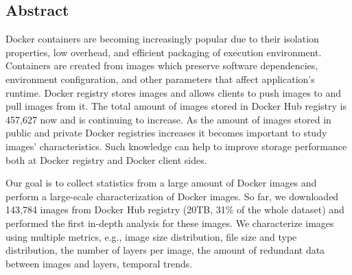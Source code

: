 \subsection*{Abstract}

Docker containers are becoming increasingly popular due to their isolation
properties, low overhead, and efficient packaging of execution environment.
Containers are created from images which preserve software dependencies,
environment configuration, and other parameters that affect application's
runtime. Docker registry stores images and allows clients to push images to and
pull images from it. The total amount of images stored in Docker Hub registry
is 457,627 now and is continuing to increase. As the amount of images stored in
public and private Docker registries increases it becomes important to
study images' characteristics. Such knowledge can help to improve storage
performance both at Docker registry and Docker client sides.

Our goal is to collect statistics from a large amount of Docker images and
perform a large-scale characterization of Docker images. So far, we downloaded
143,784 images from Docker Hub registry (20TB, 31\% of the whole dataset) and
performed the first in-depth analysis for these images. We characterize images
using multiple metrics, e.g., image size distribution, file size and type
distribution, the number of layers per image, the amount of redundant data
between images and layers, temporal trends.
